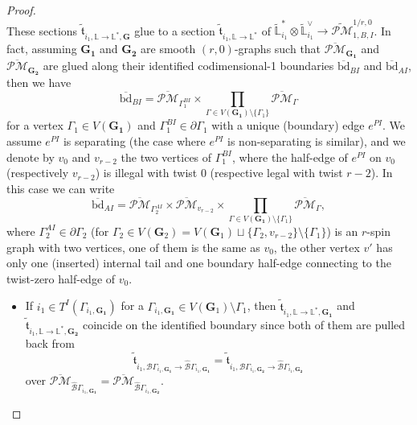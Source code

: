\documentclass[11pt]{amsart}
\theoremstyle{definition}
\theoremstyle{remark}
\newcommand{\oPMb}{{\overline{\mathcal{PM}}}}
\newcommand{\<}{\left<}
\renewcommand{\>}{\right>}
\numberwithin{equation}{section}
\begin{document}
\begin{proof}
$$        $$
        These sections $\tilde{\mathfrak{t}}_{i_1,\mathbb L \to \mathbb L^*,\mathbf{G}}$ glue to a section $\tilde{\mathfrak{t}}_{i_1,\mathbb L \to \mathbb L^*}$ of $\widetilde{\mathbb L}^*_{i_1}\otimes \widetilde{\mathbb L}_{i_1}^\vee\to \widetilde{\mathcal{PM}}^{1/r,0}_{1,B,I}$. In fact, assuming $\mathbf{G_1}$ and $\mathbf{G_2}$ are smooth $(r,0)$-graphs such that $\oPMb_{\mathbf{G_1}}$ and $\oPMb_{\mathbf{G_2}}$ are glued along their identified codimensional-1 boundaries $\overline{\text{bd}}_{BI}$ and $\overline{\text{bd}}_{AI}$, then we have 
        $$\overline{\text{bd}}_{BI}=\oPMb_{\Gamma_1^{BI}}\times \prod_{\Gamma\in V(\mathbf{G_1})\setminus\{\Gamma_1\}}\oPMb_{\Gamma}$$
        for a vertex $\Gamma_1\in V(\mathbf{G_1})$ and $\Gamma^{BI}_1\in \partial \Gamma_1$ with a unique (boundary) edge $e^{PI}$. We assume $e^{PI}$ is separating  (the case where $e^{PI}$ is non-separating is similar), and we denote by $v_0$ and $v_{r-2}$ the two vertices of $\Gamma_1^{BI}$, where the half-edge of $e^{PI}$ on $v_0$ (respectively $v_{r-2}$) is illegal with twist $0$ (respective legal with twist $r-2$). In this case we can write
        $$\overline{\text{bd}}_{AI}=\oPMb_{\Gamma_2^{AI}}\times \oPMb_{v_{r-2}}\times  \prod_{\Gamma\in V(\mathbf{G_1})\setminus\{\Gamma_1\}}\oPMb_{\Gamma},$$
        where $\Gamma_2^{AI}\in \partial \Gamma_2$ (for $\Gamma_2\in V(\bm{G}_2)=V(\bm{G}_1)\sqcup \{\Gamma_2,v_{r-2}\}\setminus \{\Gamma_1\}$) is an $r$-spin graph with two vertices, one of them is the same as $v_0$, the other vertex $v'$ has only one (inserted) internal tail and one boundary half-edge connecting to the twist-zero half-edge of $v_0$. 
        \begin{itemize}
            \item[-]
        If $i_1\in T^I(\Gamma_{i_1,\mathbf{G_1}})$ for a $\Gamma_{i_1,\mathbf{G_1}}\in V(\mathbf{G}_1)\setminus{\Gamma_1}$, then $\tilde{\mathfrak{t}}_{i_1,\mathbb L \to \mathbb L^*,\mathbf{G_1}}$ and $\tilde{\mathfrak{t}}_{i_1,\mathbb L \to \mathbb L^*,\mathbf{G_2}}$ coincide on the identified boundary since both of them are pulled back from 
        $$\tilde{\mathfrak t}_{i_1,{\mathcal B}\Gamma_{i_1,\bm{G_1}}\to\hat{\mathcal B}\Gamma_{i_1,\bm{G_1}}}=\tilde{\mathfrak t}_{i_1,{\mathcal B}\Gamma_{i_1,\bm{G_2}}\to\hat{\mathcal B}\Gamma_{i_1,\bm{G_2}}}$$
        over $\oPMb_{\hat{\mathcal B}\Gamma_{i_1,\bm{G_1}}}=\oPMb_{\hat{\mathcal B}\Gamma_{i_1,\bm{G_2}}}$.
        

\end{itemize}
\end{proof}
\end{document}

